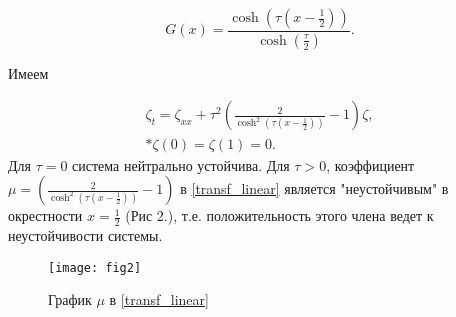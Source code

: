 \begin{equation}
    G(x) = \frac{\cosh(\tau(x - \frac{1}{2}))}{\cosh(\frac{\tau}{2})}.
\end{equation} 

Имеем 

\begin{gather} \label{transf_linear}
    \zeta_t = \zeta_{xx} + \tau^2 \left( \frac{2}{\cosh^2(\tau(x -
    \frac{1}{2}))} - 1 \right) \zeta, \\* 
    \zeta(0) = \zeta(1) = 0.
\end{gather}
Для $\tau = 0$ система нейтрально устойчива. Для $\tau > 0$, коэффициент 
$\mu = \left(\frac{2}{\cosh^2(\tau(x - \frac{1}{2}))} - 1 \right)$  в 
\eqref{transf_linear} является "неустойчивым" в окрестности 
$x = \frac{1}{2}$ (Рис 2.), т.е. положительность этого члена ведет к
неустойчивости системы.


\begin{figure}
    \centering
    \texttt{[image: fig2]}
    \caption{График $\mu$ в \eqref{transf_linear}}
\end{figure}
